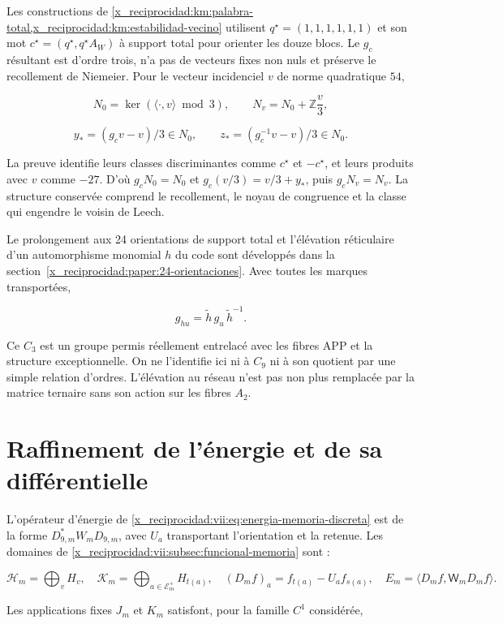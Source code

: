 Les constructions de \cref{x_reciprocidad:km:palabra-total,x_reciprocidad:km:estabilidad-vecino} utilisent \(q^\star=(1,1,1,1,1,1)\) et son mot \(c^\star=(q^\star,q^\star A_W)\) à support total pour orienter les douze blocs. Le \(g_c\) résultant est d’ordre trois, n’a pas de vecteurs fixes non nuls et préserve le recollement de Niemeier. Pour le vecteur incidenciel \(v\) de norme quadratique \(54\),

\[
N_0=\ker(\langle\cdot,v\rangle\bmod3),\qquad
N_v=N_0+\mathbb Z\frac v3,
\]

\[
y_*=(g_cv-v)/3\in N_0,\qquad
z_*=(g_c^{-1}v-v)/3\in N_0.
\]

La preuve identifie leurs classes discriminantes comme \(c^\star\) et \(-c^\star\), et leurs produits avec \(v\) comme \(-27\). D’où \(g_cN_0=N_0\) et \(g_c(v/3)=v/3+y_*\), puis \(g_cN_v=N_v\). La structure conservée comprend le recollement, le noyau de congruence et la classe qui engendre le voisin de Leech.

Le prolongement aux 24 orientations de support total et l’élévation réticulaire d’un automorphisme monomial \(h\) du code sont développés dans la section~\ref{x_reciprocidad:paper:24-orientaciones}. Avec toutes les marques transportées,

\[
g_{hu}=\widetilde h\,g_u\,\widetilde h^{-1}.
\]

Ce \(C_3\) est un groupe permis réellement entrelacé avec les fibres APP et la structure exceptionnelle. On ne l’identifie ici ni à \(C_9\) ni à son quotient par une simple relation d’ordres. L’élévation au réseau n’est pas non plus remplacée par la matrice ternaire sans son action sur les fibres \(A_2\).

\section{Raffinement de l’énergie et de sa différentielle}
\label{x_reciprocidad:paper:refinamiento-energia}

L’opérateur d’énergie de \eqref{x_reciprocidad:vii:eq:energia-memoria-discreta} est de la forme \(D_{9,m}^*W_mD_{9,m}\), avec \(U_a\) transportant l’orientation et la retenue. Les domaines de \cref{x_reciprocidad:vii:subsec:funcional-memoria} sont :

\[
\mathcal H_m=\bigoplus_vH_v,\quad
\mathcal K_m=\bigoplus_{a\in\mathcal E_m^+}H_{t(a)},\quad
(D_mf)_a=f_{t(a)}-U_af_{s(a)},\quad
E_m=\langle D_mf,\mathsf W_mD_mf\rangle.
\]

Les applications fixes \(J_m\) et \(K_m\) satisfont, pour la famille \(C^1\) considérée,


